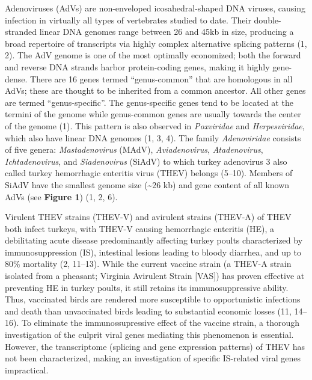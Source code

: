 \documentclass[
]{article}
\begin{document}
Adenoviruses (AdVs) are non-enveloped icosahedral-shaped DNA viruses,
causing infection in virtually all types of vertebrates studied to date.
Their double-stranded linear DNA genomes range between 26 and 45kb in
size, producing a broad repertoire of transcripts via highly complex
alternative splicing patterns (1, 2). The AdV genome is one of the most
optimally economized; both the forward and reverse DNA strands harbor
protein-coding genes, making it highly gene-dense. There are 16 genes
termed ``genus-common'' that are homologous in all AdVs; these are
thought to be inherited from a common ancestor. All other genes are
termed ``genus-specific''. The genus-specific genes tend to be located
at the termini of the genome while genus-common genes are usually
towards the center of the genome (1). This pattern is also observed in
\emph{Poxviridae} and \emph{Herpesviridae}, which also have linear DNA
genomes (1, 3, 4). The family \emph{Adenoviridae} consists of five
genera: \emph{Mastadenovirus} (MAdV), \emph{Aviadenovirus},
\emph{Atadenovirus}, \emph{Ichtadenovirus}, and \emph{Siadenovirus}
(SiAdV) to which turkey adenovirus 3 also called turkey hemorrhagic
enteritis virus (THEV) belongs (5--10). Members of SiAdV have the
smallest genome size (\textasciitilde26 kb) and gene content of all
known AdVs (see \textbf{Figure 1}) (1, 2, 6).

Virulent THEV strains (THEV-V) and avirulent strains (THEV-A) of THEV
both infect turkeys, with THEV-V causing hemorrhagic enteritis (HE), a
debilitating acute disease predominantly affecting turkey poults
characterized by immunosuppression (IS), intestinal lesions leading to
bloody diarrhea, and up to 80\% mortality (2, 11--13). While the current
vaccine strain (a THEV-A strain isolated from a pheasant; Virginia
Avirulent Strain {[}VAS{]}) has proven effective at preventing HE in
turkey poults, it still retains its immunosuppressive ability. Thus,
vaccinated birds are rendered more susceptible to opportunistic
infections and death than unvaccinated birds leading to substantial
economic losses (11, 14--16). To eliminate the immunossupressive effect
of the vaccine strain, a thorough investigation of the culprit viral
genes mediating this phenomenon is essential. However, the transcriptome
(splicing and gene expression patterns) of THEV has not been
characterized, making an investigation of specific IS-related viral
genes impractical.
\end{document}
